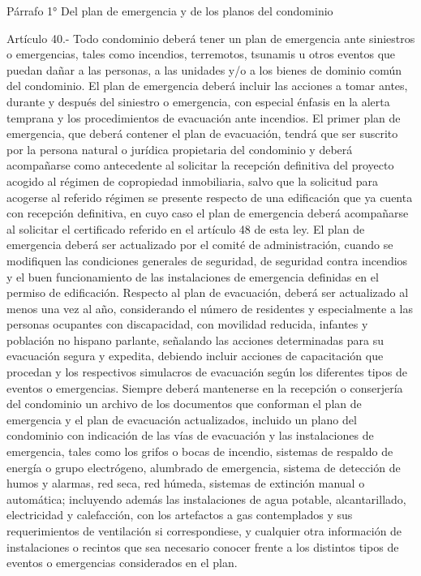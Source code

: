 Párrafo 1°
    Del plan de emergencia y de los planos del condominio

     
    Artículo 40.- Todo condominio deberá tener un plan de emergencia ante siniestros o emergencias, tales como incendios, terremotos, tsunamis u otros eventos que puedan dañar a las personas, a las unidades y/o a los bienes de dominio común del condominio. El plan de emergencia deberá incluir las acciones a tomar antes, durante y después del siniestro o emergencia, con especial énfasis en la alerta temprana y los procedimientos de evacuación ante incendios.
    El primer plan de emergencia, que deberá contener el plan de evacuación, tendrá que ser suscrito por la persona natural o jurídica propietaria del condominio y deberá acompañarse como antecedente al solicitar la recepción definitiva del proyecto acogido al régimen de copropiedad inmobiliaria, salvo que la solicitud para acogerse al referido régimen se presente respecto de una edificación que ya cuenta con recepción definitiva, en cuyo caso el plan de emergencia deberá acompañarse al solicitar el certificado referido en el artículo 48 de esta ley.
    El plan de emergencia deberá ser actualizado por el comité de administración, cuando se modifiquen las condiciones generales de seguridad, de seguridad contra incendios y el buen funcionamiento de las instalaciones de emergencia definidas en el permiso de edificación.
    Respecto al plan de evacuación, deberá ser actualizado al menos una vez al año, considerando el número de residentes y especialmente a las personas ocupantes con discapacidad, con movilidad reducida, infantes y población no hispano parlante, señalando las acciones determinadas para su evacuación segura y expedita, debiendo incluir acciones de capacitación que procedan y los respectivos simulacros de evacuación según los diferentes tipos de eventos o emergencias.
    Siempre deberá mantenerse en la recepción o conserjería del condominio un archivo de los documentos que conforman el plan de emergencia y el plan de evacuación actualizados, incluido un plano del condominio con indicación de las vías de evacuación y las instalaciones de emergencia, tales como los grifos o bocas de incendio, sistemas de respaldo de energía o grupo electrógeno, alumbrado de emergencia, sistema de detección de humos y alarmas, red seca, red húmeda, sistemas de extinción manual o automática; incluyendo además las instalaciones de agua potable, alcantarillado, electricidad y calefacción, con los artefactos a gas contemplados y sus requerimientos de ventilación si correspondiese, y cualquier otra información de instalaciones o recintos que sea necesario conocer frente a los distintos tipos de eventos o emergencias considerados en el plan.
